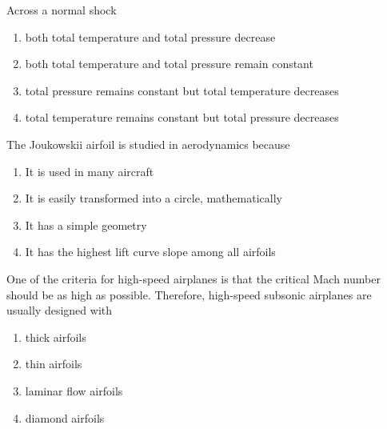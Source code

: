 \iffalse
\chapter{2007}
\author{AI24BTECH11031}
\section{ae}
\fi

\item Across a normal shock
\begin{enumerate}
    \item both total temperature and total pressure decrease
    \item both total temperature and total pressure remain constant
    \item total pressure remains constant but total temperature decreases
    \item total temperature remains constant but total pressure decreases
\end{enumerate}

\item The Joukowskii airfoil is studied in aerodynamics because
\begin{enumerate}
    \item It is used in many aircraft
    \item It is easily transformed into a circle, mathematically
    \item It has a simple geometry
    \item It has the highest lift curve slope among all airfoils
\end{enumerate}

\item One of the criteria for high-speed airplanes is that the critical Mach number should
be as high as possible. Therefore, high-speed subsonic airplanes are usually designed with
\begin{multicols}{2}
    \begin{enumerate}
        \item thick airfoils
        \item thin airfoils
        \item laminar flow airfoils
        \item diamond airfoils
    \end{enumerate}
\end{multicols}

